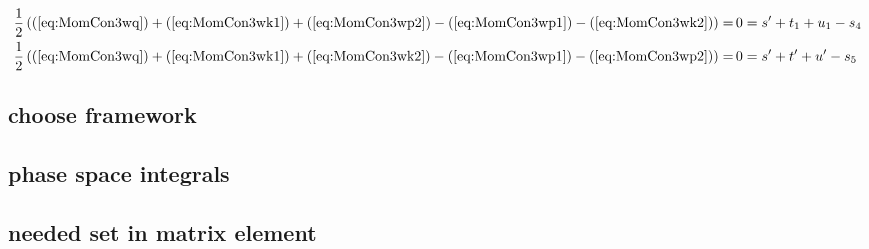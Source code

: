 \begin{align}
\frac 1 2 \left((\ref{eq:MomCon3wq}) + (\ref{eq:MomCon3wk1}) + (\ref{eq:MomCon3wp2}) - (\ref{eq:MomCon3wp1}) - (\ref{eq:MomCon3wk2})\right)=&\,0= s' + t_1 + u_1 - s_4\\
\frac 1 2 \left((\ref{eq:MomCon3wq}) + (\ref{eq:MomCon3wk1}) + (\ref{eq:MomCon3wk2}) - (\ref{eq:MomCon3wp1}) - (\ref{eq:MomCon3wp2})\right)=&\,0= s' + t' + u' - s_5 \label{eq:MonCon3s5up}
\end{align}

\subsection{choose framework}


\subsection{phase space integrals}


\subsection{needed set in matrix element}

